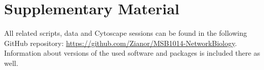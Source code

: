 \section{Supplementary Material}

All related scripts, data and Cytoscape sessions can be found in the following GitHub repository: \url{https://github.com/Zianor/MSB1014-NetworkBiology}. Information about versions of the used software and packages is included there as well.